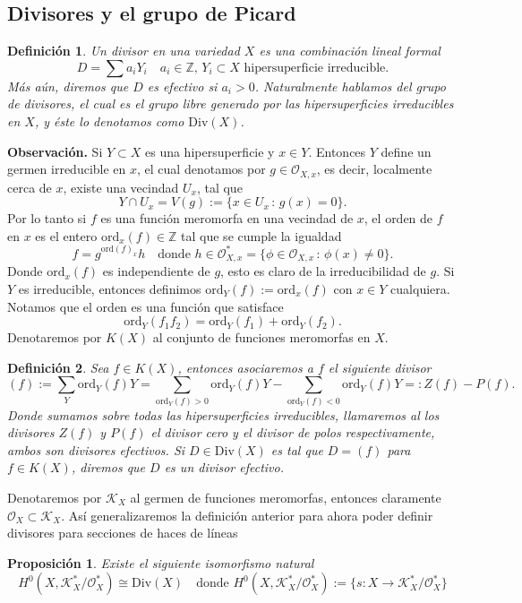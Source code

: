 \documentclass[letterpaper]{article}
\newtheorem{prop}[teorema]{Proposici\'on}
\newtheorem{def.}{Definici\'on}[section]
\newcommand{\zah}{\ensuremath{ \mathbb Z }}
\newcommand{\obs}{{\noindent \sc \textbf{Observación. }}}
\newcommand{\Div}{\ensuremath{\mathrm{Div}}}
\newcommand{\ord}{\ensuremath{\mathrm{ord}}}
\begin{document}
\subsection{Divisores y el grupo de Picard}
\begin{def.}
  Un  divisor en una variedad \(X\) es una combinación lineal formal
  \[
    D=\sum a_{i}Y_{i}\quad a_{i}\in\zah,\,Y_{i}\subset X \text{ hipersuperficie irreducible.}
  \]
\noindent Más aún, diremos que \(D\) es efectivo si \(a_{i}>0\). Naturalmente hablamos del grupo de divisores, el cual es el grupo libre generado por las hipersuperficies irreducibles en \(X\), y éste lo denotamos como \(\Div(X)\).
\end{def.}
\obs Si \(Y\subset X\) es una hipersuperficie y \(x\in Y\). Entonces \(Y\) define un germen irreducible en \(x\), el cual denotamos por \(g\in\mathcal{O}_{X,x}\), es decir, localmente cerca de \(x\), existe una vecindad \(U_{x}\), tal que
\[
  Y\cap U_{x}=V(g):=\{x\in U_{x}\,:\,g(x)=0\}.
\]
\noindent Por lo tanto si \(f\) es una función meromorfa en una vecindad de \(x\), el orden de \(f\) en \(x\) es el entero \(\ord_{x}(f)\in\zah\) tal que se cumple la igualdad
\[
  f=g^{\ord(f)_{x}}h\quad\text{donde }h\in\mathcal{O}^{*}_{X,x}=\{\phi\in\mathcal{O}_{X,x}\,:\,\phi(x)\neq0\}.
\]
\noindent Donde \(\ord_{x}(f)\) es independiente de \(g\), esto es claro de la irreducibilidad de \(g\). Si \(Y\) es irreducible, entonces definimos
\(\ord_{Y}(f):=\ord_{x}(f)\) con \(x\in Y\) cualquiera. Notamos que el orden es una función que satisface
\[
  \ord_{Y}(f_{1}f_{2})=\ord_{Y}(f_{1})+\ord_{Y}(f_{2}).
\]
Denotaremos por \(K(X)\) al conjunto de funciones meromorfas en \(X\).
\begin{def.}
  Sea \(f\in K(X)\), entonces asociaremos a \(f\) el siguiente divisor
  \[
    (f):=\sum_{Y}\ord_{Y}(f)Y=\sum_{\ord_{Y}(f)>0}\ord_{Y}(f)Y-\sum_{\ord_{Y}(f)<0}\ord_{Y}(f)Y=:Z(f)-P(f).
  \]
  \noindent Donde sumamos sobre todas las hipersuperficies irreducibles, llamaremos al los divisores \(Z(f)\) y \(P(f)\) \emph{el divisor cero} y \emph{el divisor de polos respectivamente}, ambos son divisores efectivos. Si \(D\in\Div(X)\) es tal que \(D=(f)\) para \(f\in K(X)\), diremos que \(D\) es un divisor \emph{efectivo}.
\end{def.}
Denotaremos por  \(\mathcal{K}_{X}\) al germen de funciones meromorfas, entonces claramente \(\mathcal{O}_{X}\subset\mathcal{K}_{X}\). Así generalizaremos la definición anterior para ahora poder definir divisores para secciones de haces de líneas
\begin{prop}
  Existe el siguiente isomorfismo natural
  \[
    H^{0}(X,\mathcal{K}^{*}_{X}/\mathcal{O}^{*}_{X})\cong\Div(X)\quad\text{donde }
    H^{0}(X,\mathcal{K}^{*}_{X}/\mathcal{O}^{*}_{X}):=\{s:X\rightarrow\mathcal{K}^{*}_{X}/\mathcal{O}^{*}_{X}\}
  \]
\end{prop}
\end{document}
